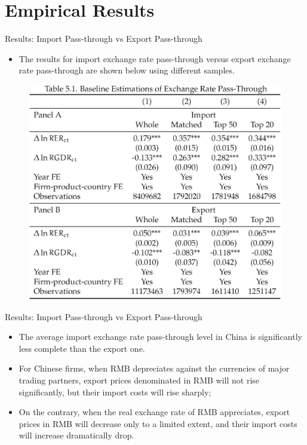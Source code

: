 \documentclass[10pt]{beamer}
\begin{document}
\section{Empirical Results}

\begin{frame}{Results: Import Pass-through vs Export Pass-through}
	\begin{itemize}
		\item The results for import exchange rate pass-through versus export exchange rate pass-through are shown below using different samples.
	\end{itemize}
	\begin{figure}[htbp]
		\centering
		\includegraphics[width=0.75\columnwidth]{Table5.1.jpg}
		\label{tab5.1}
	\end{figure}
\end{frame}

\begin{frame}{Results: Import Pass-through vs Export Pass-through}
	\begin{tcolorbox}[colback=blue!5!white, colframe=blue!75!black,title=Key Finding 1]
		\begin{itemize}
			\item The average import exchange rate pass-through level in China is significantly less complete than the export one.
		\end{itemize}
	\end{tcolorbox}
	\begin{itemize}
		\item For Chinese firms, when RMB depreciates against the currencies of major trading partners, export prices denominated in RMB will not rise significantly, but their import costs will rise sharply; 
		\item On the contrary, when the real exchange rate of RMB appreciates, export prices in RMB will decrease only to a limited extent, and their import costs will increase dramatically drop.
	\end{itemize}
\end{frame}
\end{document}
